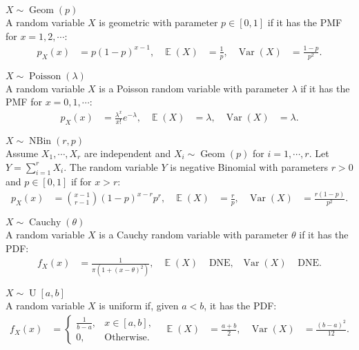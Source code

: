 \documentclass{huhtakm-template-book-v2}
\DeclareMathOperator{\E}{\mathbb{E}}
\DeclareMathOperator{\Var}{Var}
\DeclareMathOperator{\Geom}{Geom}
\DeclareMathOperator{\Poisson}{Poisson}
\DeclareMathOperator{\Cauchy}{Cauchy}
\DeclareMathOperator{\NBin}{NBin}
\DeclareMathOperator{\U}{U}
\begin{document}
    \begin{eg} $X \sim \Geom(p)$\\
        A random variable $X$ is geometric with parameter $p \in [0, 1]$ if it has the PMF for $x = 1, 2, \cdots$:
        \begin{align*}
            p_{X}(x) &= p(1 - p)^{x - 1}, & \E(X) &= \frac{1}{p}, & \Var(X) &= \frac{1 - p}{p^{2}}.
        \end{align*}
    \end{eg}
    \begin{eg} $X \sim \Poisson(\lambda)$\\
        A random variable $X$ is a Poisson random variable with parameter $\lambda$ if it has the PMF for $x = 0, 1, \cdots$:
        \begin{align*}
            p_{X}(x) &= \frac{\lambda^{x}}{x!} e^{-\lambda}, & \E(X) &= \lambda, & \Var(X) &= \lambda.
        \end{align*}
    \end{eg}
    \begin{eg} $X \sim \NBin(r, p)$\\
        Assume $X_{1}, \cdots, X_{r}$ are independent and $X_{i} \sim \Geom(p)$ for $i = 1, \cdots, r$. Let $Y = \sum_{i=1}^{r} X_{i}$. The random variable $Y$ is negative Binomial with parameters $r > 0$ and $p \in [0, 1]$ if for $x > r$:
        \begin{align*}
            p_{X}(x) &= \binom{x - 1}{r - 1} (1 - p)^{x - r} p^{r}, & \E(X) &= \frac{r}{p}, & \Var(X) &= \frac{r(1 - p)}{p^{2}}.
        \end{align*}
    \end{eg}
    \begin{eg} $X \sim \Cauchy(\theta)$\\
        A random variable $X$ is a Cauchy random variable with parameter $\theta$ if it has the PDF:
        \begin{align*}
            f_{X}(x) &= \frac{1}{\pi(1 + (x - \theta)^{2})}, & \E(X) &\text{ DNE}, & \Var(X) &\text{ DNE}.
        \end{align*}
    \end{eg}
    \begin{eg} $X \sim \U[a, b]$\\
        A random variable $X$ is uniform if, given $a < b$, it has the PDF:
        \begin{align*}
            f_{X}(x) &= \begin{cases}
                \frac{1}{b - a}, &x \in [a, b],\\
                0, &\text{Otherwise}.
            \end{cases} & \E(X) &= \frac{a + b}{2}, & \Var(X) &= \frac{(b - a)^{2}}{12}.
        \end{align*}
    \end{eg}
\end{document}
